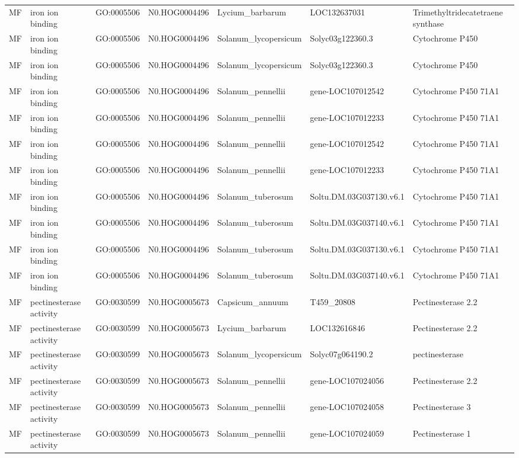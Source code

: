 \begin{table}
\begin{tabular}[t]{lllllll}
MF & iron ion binding & GO:0005506 & N0.HOG0004496 & Lycium\_barbarum & LOC132637031 & Trimethyltridecatetraene synthase\\
MF & iron ion binding & GO:0005506 & N0.HOG0004496 & Solanum\_lycopersicum & Solyc03g122360.3 & Cytochrome P450\\
MF & iron ion binding & GO:0005506 & N0.HOG0004496 & Solanum\_lycopersicum & Solyc03g122360.3 & Cytochrome P450\\
MF & iron ion binding & GO:0005506 & N0.HOG0004496 & Solanum\_pennellii & gene-LOC107012542 & Cytochrome P450 71A1\\
MF & iron ion binding & GO:0005506 & N0.HOG0004496 & Solanum\_pennellii & gene-LOC107012233 & Cytochrome P450 71A1\\
MF & iron ion binding & GO:0005506 & N0.HOG0004496 & Solanum\_pennellii & gene-LOC107012542 & Cytochrome P450 71A1\\
MF & iron ion binding & GO:0005506 & N0.HOG0004496 & Solanum\_pennellii & gene-LOC107012233 & Cytochrome P450 71A1\\
MF & iron ion binding & GO:0005506 & N0.HOG0004496 & Solanum\_tuberosum & Soltu.DM.03G037130.v6.1 & Cytochrome P450 71A1\\
MF & iron ion binding & GO:0005506 & N0.HOG0004496 & Solanum\_tuberosum & Soltu.DM.03G037140.v6.1 & Cytochrome P450 71A1\\
MF & iron ion binding & GO:0005506 & N0.HOG0004496 & Solanum\_tuberosum & Soltu.DM.03G037130.v6.1 & Cytochrome P450 71A1\\
MF & iron ion binding & GO:0005506 & N0.HOG0004496 & Solanum\_tuberosum & Soltu.DM.03G037140.v6.1 & Cytochrome P450 71A1\\
MF & pectinesterase activity & GO:0030599 & N0.HOG0005673 & Capsicum\_annuum & T459\_20808 & Pectinesterase 2.2\\
MF & pectinesterase activity & GO:0030599 & N0.HOG0005673 & Lycium\_barbarum & LOC132616846 & Pectinesterase 2.2\\
MF & pectinesterase activity & GO:0030599 & N0.HOG0005673 & Solanum\_lycopersicum & Solyc07g064190.2 & pectinesterase\\
MF & pectinesterase activity & GO:0030599 & N0.HOG0005673 & Solanum\_pennellii & gene-LOC107024056 & Pectinesterase 2.2\\
MF & pectinesterase activity & GO:0030599 & N0.HOG0005673 & Solanum\_pennellii & gene-LOC107024058 & Pectinesterase 3\\
MF & pectinesterase activity & GO:0030599 & N0.HOG0005673 & Solanum\_pennellii & gene-LOC107024059 & Pectinesterase 1\\

\end{tabular}
\end{table}
